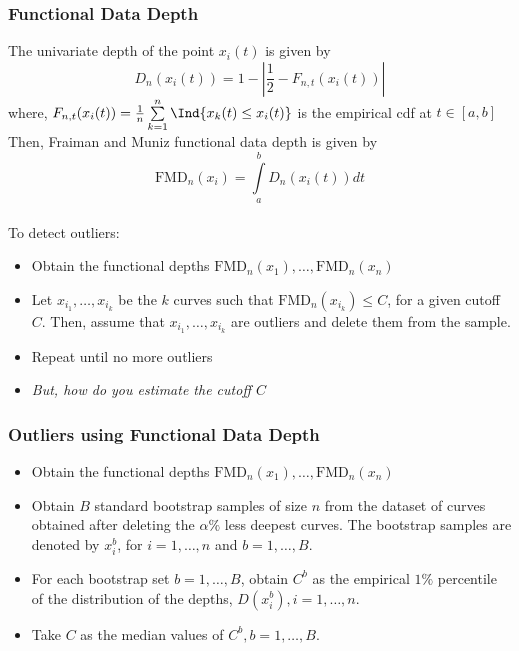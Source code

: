\documentclass[10pt,dvipsnames,table]{beamer}
\begin{document}
\begin{frame}
\frametitle{Functional Data Depth}
The univariate depth of the point $x_i(t)$ is given by
\[ D_n(x_i(t)) = 1 - \left| \frac{1}{2} - F_{n,t} (x_i (t)) \right| \]
where, $F_{n,t} (x_i (t)) = \frac{1}{n}\sum\limits_{k=1}^{n}\Ind\{ x_k(t) \leq x_i(t)\}$ is the empirical cdf at $t \in [a,b]$ \\
Then, Fraiman and Muniz functional data depth is given by
\[ \text{FMD}_n(x_i) = \int\limits_a^b D_n(x_i(t)) dt\] \\
To detect outliers:
\begin{itemize}
\item Obtain the functional depths $\text{FMD}_n(x_1), \dots, \text{FMD}_n(x_n)$
\item Let $x_{i_1}, \dots, x_{i_k}$ be the $k$ curves such that $\text{FMD}_n (x_{i_k}) \leq C$, for a given cutoff $C$. Then, assume that $x_{i_1}, \dots, x_{i_k}$ are outliers and delete them from the sample.
\item Repeat until no more outliers
\item {\emph{But, how do you estimate the cutoff $C$}}
\end{itemize}
\end{frame}

\begin{frame}
\frametitle{Outliers using Functional Data Depth}
\begin{itemize}
\item Obtain the functional depths $\text{FMD}_n(x_1), \dots, \text{FMD}_n(x_n)$
\item Obtain $B$ standard bootstrap samples of size $n$ from the dataset of curves obtained after deleting the $\alpha \%$ less deepest curves. The bootstrap samples are denoted by $x_i^b$, for $i = 1, \dots, n$ and $b = 1, \dots, B$.
\item For each bootstrap set $b = 1, \dots, B$, obtain $C^b$ as the empirical $1\%$ percentile of the distribution of the depths, $D(x_i^b), i = 1, \dots, n$.
\item Take $C$ as the median values of $C^b, b = 1, \dots, B$.
\end{itemize}
\end{frame}
\end{document}
